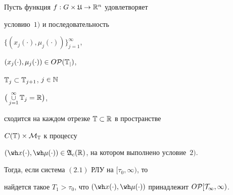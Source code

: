 \begin{thms}


Пусть функция $f:G\times\frak U\to\Bbb R^n$ удовлетворяет


условию~$1)$ и последовательность


$\{(x_j(\cdot),\mu_j(\cdot))\}_{j=1}^\infty$,


$(x_j(\cdot),\mu_j(\cdot))\in O\cal P(\Bbb T_{j})$,


$\Bbb T_{j}\subset\Bbb T_{j+1}$, $j\in\Bbb N$


$\big(\mathop{\cup}\limits_{j=1}^{\infty}\Bbb T_{j}=\Bbb R\big)$,


сходится на каждом отрезке $\Bbb T\subset\Bbb R$ в пространстве


$C(\Bbb T)\times\cal M_{\Bbb T}$ к процессу


$(\wh x(\cdot),\wh\mu(\cdot))


\in\frak A_c(\Bbb R)$, на котором выполнено условие~$2)$.


Тогда, если система $(2.1)$ РЛУ на $[\tau_0,\infty)$, то


найдется такое $T_1>\tau_0$, что $(\wh


x(\cdot),\wh\mu(\cdot))$ принадлежит $O\cal P[T_1,\infty)$.


\end{thms}








